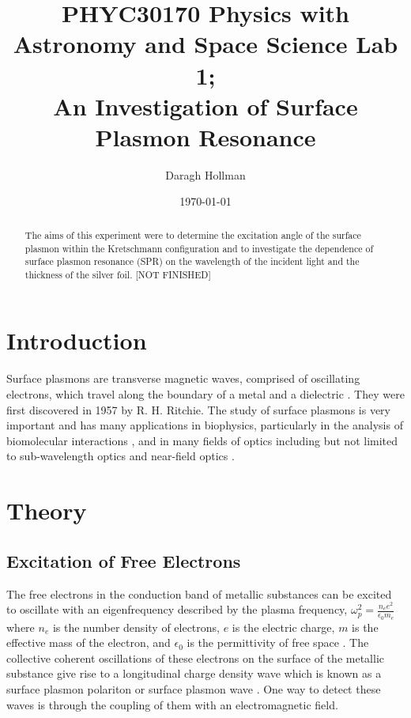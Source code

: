\documentclass[%
reprint,
amsmath,amssymb,
aps,
]{revtex4-2}
\begin{document}
	
	
	\title{PHYC30170 Physics with Astronomy and Space Science Lab 1;\\An Investigation of Surface Plasmon Resonance}
	
	\author{Daragh Hollman}
	
	\date{\today}
	
	\begin{abstract}
		The aims of this experiment were to determine the excitation angle of the surface plasmon within the Kretschmann configuration and to investigate the dependence of surface plasmon resonance (SPR) on the wavelength of the incident light and the thickness of the silver foil. [NOT FINISHED]
	\end{abstract}

	\maketitle
	
	\section{Introduction}		
		Surface plasmons are transverse magnetic waves, comprised of oscillating electrons, which travel along the boundary of a metal and a dielectric \cite{undergradToledo}. They were first discovered in 1957 by R. H. Ritchie. The study of surface plasmons is very important and has many applications in biophysics, particularly in the analysis of biomolecular interactions \cite{biomedicalApplications}, and in many fields of optics including but not limited to sub-wavelength optics and near-field optics \cite{opticalApplications}.
	
	\section{Theory}
		\subsection{Excitation of Free Electrons}
			The free electrons in the conduction band of metallic substances can be excited to oscillate with an eigenfrequency described by the plasma frequency, $\omega_p^2 = \frac{n_e e^2}{\epsilon_0 m_e}$ where $n_e$ is the number density of electrons, $e$ is the electric charge, $m$ is the effective mass of the electron, and $\epsilon_0$ is the permittivity of free space \cite{pluchery}. The collective coherent oscillations of these electrons on the surface of the metallic substance give rise to a longitudinal charge density wave which is known as a surface plasmon polariton or surface plasmon wave \cite{pluchery}\cite{zeng}. One way to detect these waves is through the coupling of them with an electromagnetic field.
			
\end{document}
